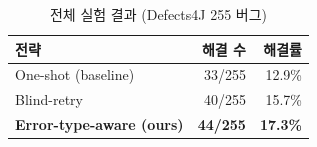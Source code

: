\begin{table}[t]
\caption{전체 실험 결과 (Defects4J 255 버그)}
\label{tab:overall}
\centering
\begin{tabular}{lrr}
\toprule
전략 & 해결 수 & 해결률 \\
\midrule
One-shot (baseline) & 33/255 & 12.9\% \\
Blind-retry & 40/255 & 15.7\% \\
\textbf{Error-type-aware (ours)} & \textbf{44/255} & \textbf{17.3\%} \\
\bottomrule
\end{tabular}
\end{table}